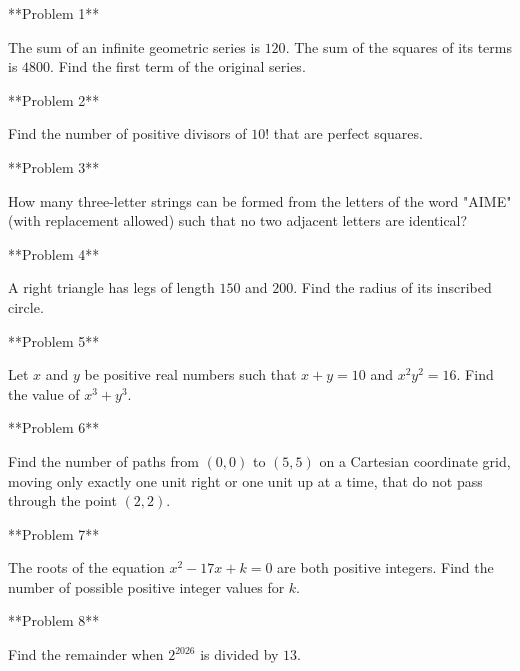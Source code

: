 **Problem 1**

The sum of an infinite geometric series is $120$. The sum of the squares of its terms is $4800$. Find the first term of the original series.

**Problem 2**

Find the number of positive divisors of $10!$ that are perfect squares.

**Problem 3**

How many three-letter strings can be formed from the letters of the word "AIME" (with replacement allowed) such that no two adjacent letters are identical?

**Problem 4**

A right triangle has legs of length $150$ and $200$. Find the radius of its inscribed circle.

**Problem 5**

Let $x$ and $y$ be positive real numbers such that $x+y=10$ and $x^2 y^2 = 16$. Find the value of $x^3 + y^3$.

**Problem 6**

Find the number of paths from $(0,0)$ to $(5,5)$ on a Cartesian coordinate grid, moving only exactly one unit right or one unit up at a time, that do not pass through the point $(2,2)$.

**Problem 7**

The roots of the equation $x^2 - 17x + k = 0$ are both positive integers. Find the number of possible positive integer values for $k$.

**Problem 8**

Find the remainder when $2^{2026}$ is divided by $13$.

